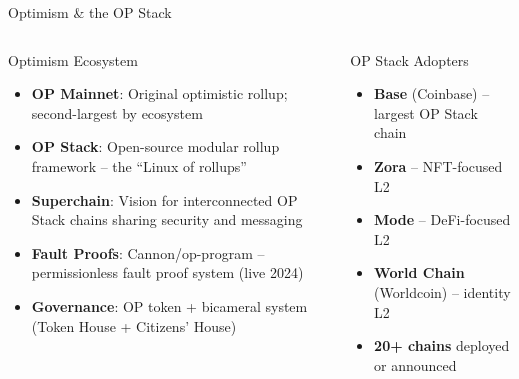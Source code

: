 \documentclass[8pt,aspectratio=169]{beamer}
\begin{document}
\begin{frame}{Optimism \& the OP Stack}
\begin{columns}[T]
\begin{block}{Optimism Ecosystem}
\footnotesize
\begin{itemize}
  \item \textbf{OP Mainnet}: Original optimistic rollup; second-largest by ecosystem
  \item \textbf{OP Stack}: Open-source modular rollup framework -- the ``Linux of rollups''
  \item \textbf{Superchain}: Vision for interconnected OP Stack chains sharing security and messaging
  \item \textbf{Fault Proofs}: Cannon/op-program -- permissionless fault proof system (live 2024)
  \item \textbf{Governance}: OP token + bicameral system (Token House + Citizens' House)
\end{itemize}
\end{block}
\vspace{2mm}
\begin{block}{OP Stack Adopters}
\footnotesize
\begin{itemize}
  \item \textbf{Base} (Coinbase) -- largest OP Stack chain
  \item \textbf{Zora} -- NFT-focused L2
  \item \textbf{Mode} -- DeFi-focused L2
  \item \textbf{World Chain} (Worldcoin) -- identity L2
  \item \textbf{20+ chains} deployed or announced
\end{itemize}
\end{block}
\vspace{1mm}
\end{columns}
\end{frame}
\end{document}
